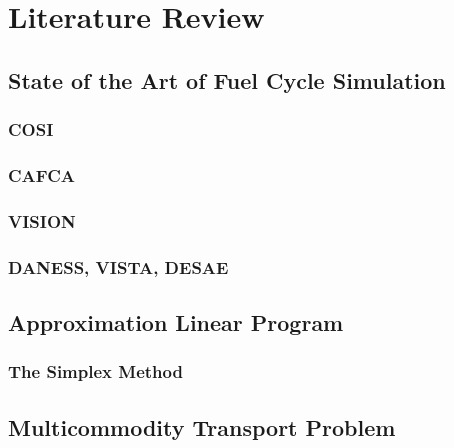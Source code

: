 \chapter{Literature Review}\label{ch:litreview}

\section{State of the Art of Fuel Cycle Simulation}\label{sec:simulators}


\subsection{COSI}\label{sec:cosi}


\subsection{CAFCA}\label{sec:cafca}


\subsection{VISION}\label{sec:vision}
%

\subsection{DANESS, VISTA, DESAE}\label{sec:other-sims}

\section{Approximation Linear Program}\label{sec:approx}

\subsection{The Simplex Method}

\section{Multicommodity Transport Problem}\label{sec:MCTP}

